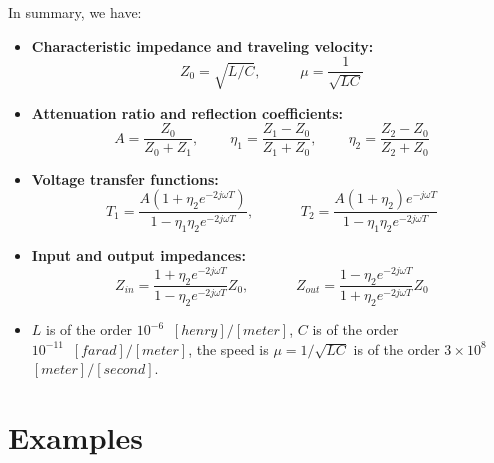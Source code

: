 In summary, we have:
\begin{itemize}
\item {\bf Characteristic impedance and traveling velocity:}
  \[	Z_0=\sqrt{L/C},\;\;\;\;\;\;\;\;\;\;\mu=\frac{1}{\sqrt{LC}}	\]
\item {\bf Attenuation ratio and reflection coefficients:}
  \[ A=\frac{Z_0}{Z_0+Z_1},\;\;\;\;\;\;\;\; \eta_1=\frac{Z_1-Z_0}{Z_1+Z_0},
  \;\;\;\;\;\;\;\;\eta_2=\frac{Z_2-Z_0}{Z_2+Z_0} \]
\item {\bf Voltage transfer functions:}
  \[ T_1=\frac{A(1+\eta_2e^{-2j\omega T})}{1-\eta_1\eta_2e^{-2j\omega T}},
  \;\;\;\;\;\;\;\;\;\;\;\;
  T_2=\frac{A(1+\eta_2)e^{-j\omega T}}{1-\eta_1\eta_2e^{-2j\omega T}} \]
\item {\bf Input and output impedances:}
  \[ Z_{in}=\frac{1+\eta_2e^{-2j\omega T}}{1-\eta_2e^{-2j\omega T}}Z_0,
  \;\;\;\;\;\;\;\;\;\;\;\;
  Z_{out}=\frac{1-\eta_2e^{-2j\omega T}}{1+\eta_2e^{-2j\omega T}}Z_0 \]
\item $L$ is of the order $10^{-6}\;\;[henry]/[meter]$, $C$ is of the
  order $10^{-11}\;\;[farad]/[meter]$, the speed is
  $\mu=1/\sqrt{LC}$ is of the order $3\times 10^8$ $[meter]/[second]$.
  
\end{itemize}



\section*{Examples}

